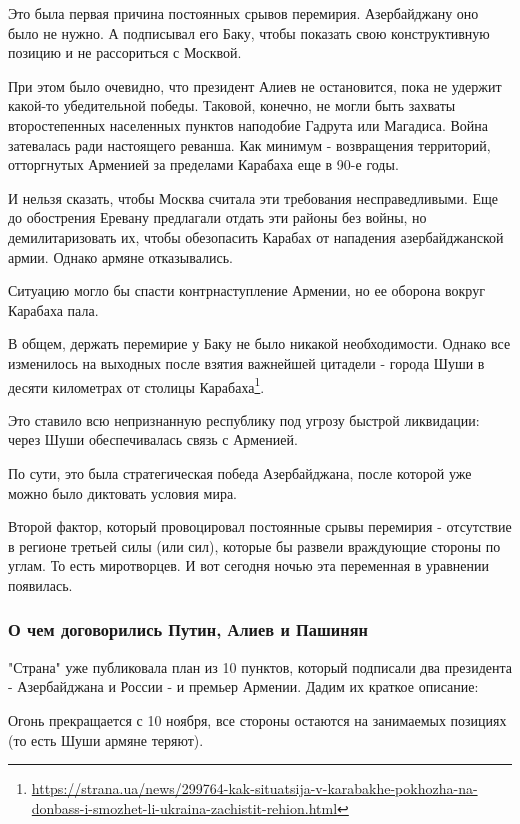 Это была первая причина постоянных срывов перемирия. Азербайджану оно было не
нужно. А подписывал его Баку, чтобы показать свою конструктивную позицию и не
рассориться с Москвой. 

При этом было очевидно, что президент Алиев не остановится, пока не удержит
какой-то убедительной победы. Таковой, конечно, не могли быть захваты
второстепенных населенных пунктов наподобие Гадрута или Магадиса. Война
затевалась ради настоящего реванша. Как минимум - возвращения территорий,
отторгнутых Арменией за пределами Карабаха еще в 90-е годы. 

И нельзя сказать, чтобы Москва считала эти требования несправедливыми. Еще до
обострения Еревану предлагали отдать эти районы без войны, но демилитаризовать
их, чтобы обезопасить Карабах от нападения азербайджанской армии. Однако армяне
отказывались.

Ситуацию могло бы спасти контрнаступление Армении, но ее оборона вокруг
Карабаха пала. 

В общем, держать перемирие у Баку не было никакой необходимости. Однако все
изменилось на выходных после взятия важнейшей цитадели - города Шуши в десяти
километрах от столицы
Карабаха\footnote{\url{https://strana.ua/news/299764-kak-situatsija-v-karabakhe-pokhozha-na-donbass-i-smozhet-li-ukraina-zachistit-rehion.html}}.

Это ставило всю непризнанную республику под угрозу быстрой ликвидации: через
Шуши обеспечивалась связь с Арменией. 

По сути, это была стратегическая победа Азербайджана, после которой уже можно
было диктовать условия мира. 

Второй фактор, который провоцировал постоянные срывы перемирия - отсутствие в
регионе третьей силы (или сил), которые бы развели враждующие стороны по углам.
То есть миротворцев. И вот сегодня ночью эта переменная в уравнении появилась. 

\subsubsection{О чем договорились Путин, Алиев и Пашинян  }

"Страна" уже публиковала план из 10 пунктов, который подписали два президента -
Азербайджана и России - и премьер Армении. Дадим их краткое описание: 

Огонь прекращается с 10 ноября, все стороны остаются на занимаемых позициях (то
есть Шуши армяне теряют).

